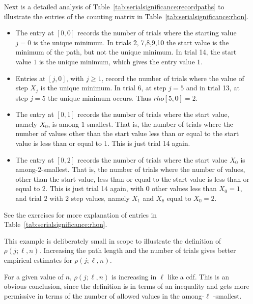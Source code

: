 \documentclass[12pt]{article}
\begin{document}
\begin{example}
    Next is a detailed analysis of Table~\ref{tab:serialsignificance:recordpaths} to illustrate
    the entries of the counting matrix in Table~\ref{tab:serialsignificance:rhon}.
    \begin{itemize}
    \item The entry at \( [0,0] \)  records the number of trials
     where the starting value \( j=0 \) is the unique minimum.  In trials 2,
     7,8,9,10 the start value is the minimum of the path, but not the unique
     minimum.
     In trial 14, the start value \( 1 \)  is the unique minimum, which gives
   the entry value \( 1 \).
   \item
    Entries at \( [j,0] \), with \( j \ge 1 \), record the number of trials where
   the value of step \( X_j \) is the unique minimum.  In trial 6, at step \( j=5 \)
   and in trial 13, at step \( j = 5 \) the unique minimum occurs.  Thus \( rho[5,0] = 2 \).
   \item
   The entry at \( [0,1] \) records the number of trials where
   the start value, namely \( X_0 \), is among-\(1\)-smallest.  That is, the
   number of trials where the number of values other than the start
   value less than or equal to the start value is less than or equal to \( 1 \).  This is just
   trial 14 again.
   \item
   The entry at \( [0,2] \) records the number of trials where
   the start value \( X_0 \) is among-\(2\)-smallest.  That is, the
   number of trials where the number of values, other than the start
   value, less than or equal to the start value is less than or equal to  \( 2 \).  This is just
   trial 14 again, with \( 0 \) other values less than \( X_0 = 1 \), and trial 2
   with \( 2 \) step values, namely \( X_1 \) and \( X_8 \) equal to \( X_0 = 2 \).
    \end{itemize}
   See the exercises for more explanation of entries in
   Table~\ref{tab:serialsignificance:rhon}.

   This example is deliberately small in scope to illustrate the
   definition of \( \rho(j; \ell, n) \).  Increasing the path
   length and the number of trials gives better empirical estimates
   for \( \rho(j; \ell, n) \).
   
   \begin{remark}
   For a given value of \( n \),  \( \rho(j; \ell, n) \) is increasing in
   \( \ell \) like a cdf.  This is an obvious conclusion, since the definition is
   in terms of an inequality and gets more permissive in terms of the
   number of allowed values in the among-\(\ell\) -smallest.
   \end{remark}



\end{example}
\end{document}
